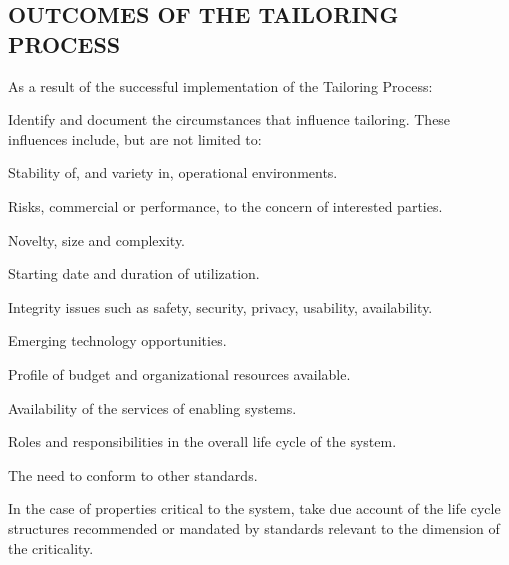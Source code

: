 	\subsection{OUTCOMES OF THE TAILORING PROCESS}
	\begin{adjustwidth}{0.5em}{0pt}

		As a result of the successful implementation of the Tailoring Process:

		\begin{compactenum}

			\item Identify and document the circumstances that influence tailoring. These influences include, but are not limited to:

			\begin{compactenum}

				\item Stability of, and variety in, operational environments.

				\item Risks, commercial or performance, to the concern of interested parties.

				\item Novelty, size and complexity.

				\item Starting date and duration of utilization.

				\item Integrity issues such as safety, security, privacy, usability, availability.

				\item Emerging technology opportunities.

				\item Profile of budget and organizational resources available.

				\item Availability of the services of enabling systems.

				\item Roles and responsibilities in the overall life cycle of the system.

				\item The need to conform to other standards.

			\end{compactenum}
			
			\item In the case of properties critical to the system, take due account of the life cycle structures recommended or mandated by standards relevant to the dimension of the criticality.


\end{compactenum}
\end{adjustwidth}
